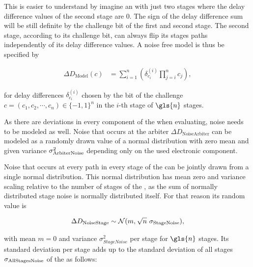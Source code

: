 This is easier to understand by imagine an \apuf with just two stages where the delay difference values of the second stage are 0. %
The sign of the delay difference sum will be still definite by the challenge bit of the first and second stage.
The second stage, according to its challenge bit, can always flip its stages paths independently of its delay difference values.
A noise free \apuf model is thus be specified by

\begin{align}
\Delta D_{\mathrm{Model}}(c) &= \sum_{i=1}^{n}\left(\delta_{c_{i}}^{(i)}\prod_{j=i}^{n}c_{j}\right), \label{equ:pufmodelc}
\end{align}

for delay differences $\delta_{c_{i}}^{(i)}$ chosen by the bit of the challenge $c = (c_1, c_2, \cdots, c_n) \in \{-1, 1\}^n$ in the $i$-th stage of $\gls{n}$ stages.

As there are deviations in every component of the \puf when evaluating, noise needs to be modeled as well.
Noise that occurs at the arbiter $\Delta D_{\mathrm{Noise Arbiter}}$ can be modeled as a randomly drawn value of a normal distribution with zero mean and given variance $\sigma_{\mathrm{Arbiter Noise}}^2$ depending only on the used electronic component. %

Noise that occurs at every path in every stage of the \apuf can be jointly drawn from a single normal distribution.
This normal distribution has mean zero and variance scaling relative to the number of stages of the \apuf, as the sum of normally distributed stage noise is normally distributed itself.
For that reason its random value is 

\begin{align}
\Delta D_{\mathrm{Noise Stage}} \sim \mathcal{N} (m,\ \sqrt[]{n}\ \sigmaSNoise), \label{equ:stagenoisedistribution}
\end{align}

with mean $m = 0$ and variance $\sigma_{Stage Noise}^2$ per stage for $\gls{n}$ stages.
Its standard deviation per stage adds up to the standard deviation of all stages $\sigma_{\mathrm{All Stages Noise}}$ of the \puf as follows:

